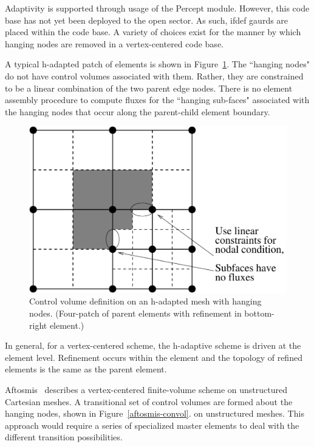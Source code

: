 Adaptivity is supported through usage of the Percept module. However, this code base has not yet
been deployed to the open sector. As such, ifdef gaurds are placed within the code base. A variety of 
choices exist for the manner by which hanging nodes are removed in a vertex-centered code base.

A typical h-adapted patch of elements
is shown in Figure~\ref{hadapt-convol}.  The ``hanging nodes"
do not have control volumes associated with them.  Rather,
they are constrained to be a linear combination of the
two parent edge nodes.  There is no element assembly procedure 
to compute fluxes for the ``hanging sub-faces" associated with the hanging 
nodes that occur along the parent-child element boundary.

\begin{figure}[h]
  \centerline{\includegraphics[width=5.5in]{images/hadapt.pdf}}
  \vspace{0.25in}
  \caption{Control volume definition on an h-adapted mesh
           with hanging nodes. (Four-patch of parent elements 
           with refinement in bottom-right element.) }
  \label{hadapt-convol}
\end{figure}

\noindent
In general, for a vertex-centered scheme, the h-adaptive scheme is driven at the element level.
Refinement occurs within the element and the topology of refined elements is the same as the parent element. 

Aftosmis~\cite{Aftosmis:94} describes a vertex-centered
finite-volume scheme on unstructured Cartesian meshes.
A transitional set of control volumes are formed about
the hanging nodes, shown in Figure~\ref{aftosmis-convol}.  
on unstructured meshes. This approach would require a
series of specialized master elements to deal with the
different transition possibilities.


